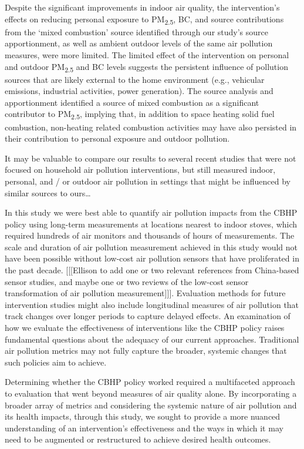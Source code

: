 \documentclass[
  letterpaper,
  DIV=11,
  numbers=noendperiod]{scrartcl}
\begin{document}
Despite the significant improvements in indoor air quality, the
intervention's effects on reducing personal exposure to
PM\textsubscript{2.5}, BC, and source contributions from the `mixed
combustion' source identified through our study's source apportionment,
as well as ambient outdoor levels of the same air pollution measures,
were more limited. The limited effect of the intervention on personal
and outdoor PM\textsubscript{2.5} and BC levels suggests the persistent
influence of pollution sources that are likely external to the home
environment (e.g., vehicular emissions, industrial activities, power
generation). The source analysis and apportionment identified a source
of mixed combustion as a significant contributor to
PM\textsubscript{2.5}, implying that, in addition to space heating solid
fuel combustion, non-heating related combustion activities may have also
persisted in their contribution to personal exposure and outdoor
pollution.

It may be valuable to compare our results to several recent studies that
were not focused on household air pollution interventions, but still
measured indoor, personal, and / or outdoor air pollution in settings
that might be influenced by similar sources to ours\ldots{}

In this study we were best able to quantify air pollution impacts from
the CBHP policy using long-term measurements at locations nearest to
indoor stoves, which required hundreds of air monitors and thousands of
hours of measurements. The scale and duration of air pollution
measurement achieved in this study would not have been possible without
low-cost air pollution sensors that have proliferated in the past
decade. {[}{[}{[}Ellison to add one or two relevant references from
China-based sensor studies, and maybe one or two reviews of the low-cost
sensor transformation of air pollution measurement{]}{]}{]}. Evaluation
methods for future intervention studies might also include longitudinal
measures of air pollution that track changes over longer periods to
capture delayed effects. An examination of how we evaluate the
effectiveness of interventions like the CBHP policy raises fundamental
questions about the adequacy of our current approaches. Traditional air
pollution metrics may not fully capture the broader, systemic changes
that such policies aim to achieve.

Determining whether the CBHP policy worked required a multifaceted
approach to evaluation that went beyond measures of air quality alone.
By incorporating a broader array of metrics and considering the systemic
nature of air pollution and its health impacts, through this study, we
sought to provide a more nuanced understanding of an intervention's
effectiveness and the ways in which it may need to be augmented or
restructured to achieve desired health outcomes.
\end{document}
